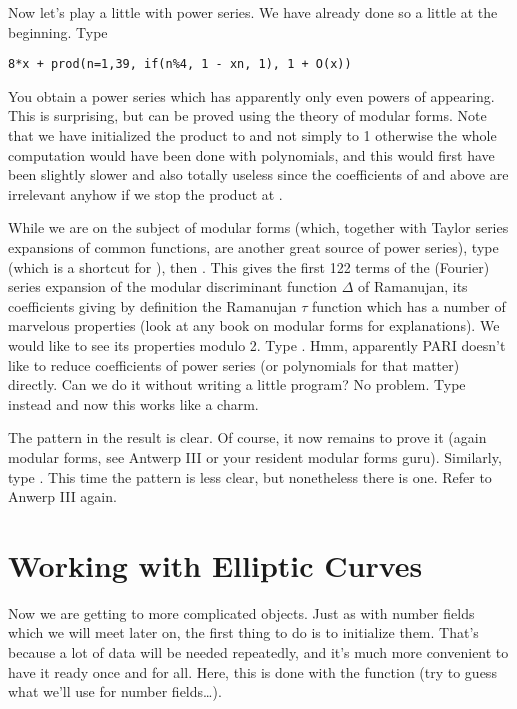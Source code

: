 Now let's play a little with power series. We have already done so a little
at the beginning.  Type

\centerline{\tt 8*x + prod(n=1,39, if(n\%4, 1 - x\pow n, 1),
                           1 + O(x))}

  You obtain a power series which has apparently only even powers of 
appearing. This is surprising, but can be proved using the theory of modular
forms. Note that we have initialized the product to  and
not simply to 1 otherwise the whole computation would have been done with
polynomials, and this would first have been slightly slower and also totally
useless since the coefficients of  and above are irrelevant
anyhow if we stop the product at .

While we are on the subject of modular forms (which, together with Taylor
series expansions of common functions, are another great source of power
series), type  (which is a shortcut for
), then . This
gives the first 122 terms of the (Fourier) series expansion of the modular
discriminant function $\Delta$ of Ramanujan, its coefficients giving by
definition the Ramanujan $\tau$ function which has a number of marvelous
properties (look at any book on modular forms for explanations). We would like
to see its properties modulo 2. Type . Hmm, apparently PARI
doesn't like to
reduce coefficients of power series (or polynomials for that matter) directly.
Can we do it without writing a little program? No problem. Type instead
 and now this works like a charm.

The pattern in the result is clear. Of course, it now remains to prove it
(again modular forms, see Antwerp III or your resident modular forms guru).
Similarly, type . This time the pattern is
less clear, but nonetheless there is one. Refer to Anwerp III again.

\section{Working with Elliptic Curves}

Now we are getting to more complicated objects. Just as with number fields
which we will meet later on, the first thing to do is to initialize them.
That's because a lot of data will be needed repeatedly, and it's much more
convenient to have it ready once and for all. Here, this is done with the
function  (try to guess what we'll use for number fields\dots).


